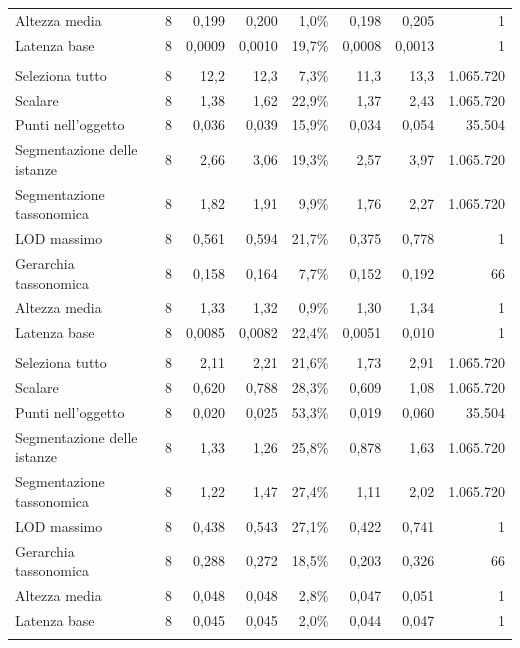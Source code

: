 \begin{small}
\begin{longtable}{lrrrrrr r}
\quad Altezza media & 8 & 0,199 & 0,200 & 1,0\% & 0,198 & 0,205 & 1 \\
\quad Latenza base & 8 & 0,0009 & 0,0010 & 19,7\% & 0,0008 & 0,0013 & 1 \\
\addlinespace
\multicolumn{8}{l}{\textbf{qEndpoint}}\\
\quad Seleziona tutto & 8 & 12,2 & 12,3 & 7,3\% & 11,3 & 13,3 & 1.065.720 \\
\quad Scalare & 8 & 1,38 & 1,62 & 22,9\% & 1,37 & 2,43 & 1.065.720 \\
\quad Punti nell'oggetto & 8 & 0,036 & 0,039 & 15,9\% & 0,034 & 0,054 & 35.504 \\
\quad Segmentazione delle istanze & 8 & 2,66 & 3,06 & 19,3\% & 2,57 & 3,97 & 1.065.720 \\
\quad Segmentazione tassonomica & 8 & 1,82 & 1,91 & 9,9\% & 1,76 & 2,27 & 1.065.720 \\
\quad LOD massimo & 8 & 0,561 & 0,594 & 21,7\% & 0,375 & 0,778 & 1 \\
\quad Gerarchia tassonomica & 8 & 0,158 & 0,164 & 7,7\% & 0,152 & 0,192 & 66 \\
\quad Altezza media & 8 & 1,33 & 1,32 & 0,9\% & 1,30 & 1,34 & 1 \\
\quad Latenza base & 8 & 0,0085 & 0,0082 & 22,4\% & 0,0051 & 0,010 & 1 \\
\addlinespace
\multicolumn{8}{l}{\textbf{QLever}}\\
\quad Seleziona tutto & 8 & 2,11 & 2,21 & 21,6\% & 1,73 & 2,91 & 1.065.720 \\
\quad Scalare & 8 & 0,620 & 0,788 & 28,3\% & 0,609 & 1,08 & 1.065.720 \\
\quad Punti nell'oggetto & 8 & 0,020 & 0,025 & 53,3\% & 0,019 & 0,060 & 35.504 \\
\quad Segmentazione delle istanze & 8 & 1,33 & 1,26 & 25,8\% & 0,878 & 1,63 & 1.065.720 \\
\quad Segmentazione tassonomica & 8 & 1,22 & 1,47 & 27,4\% & 1,11 & 2,02 & 1.065.720 \\
\quad LOD massimo & 8 & 0,438 & 0,543 & 27,1\% & 0,422 & 0,741 & 1 \\
\quad Gerarchia tassonomica & 8 & 0,288 & 0,272 & 18,5\% & 0,203 & 0,326 & 66 \\
\quad Altezza media & 8 & 0,048 & 0,048 & 2,8\% & 0,047 & 0,051 & 1 \\
\quad Latenza base & 8 & 0,045 & 0,045 & 2,0\% & 0,044 & 0,047 & 1 \\
\addlinespace
\multicolumn{8}{l}{\textbf{RDFLib}}\\

\end{longtable}
\end{small}
